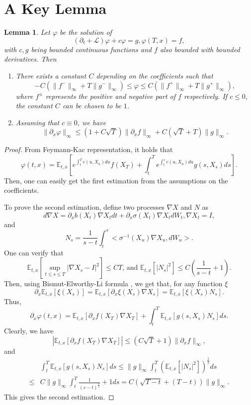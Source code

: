 \documentclass[11pt]{article}
\newtheorem{lemma}{Lemma}[section]
\begin{document}
\section{A Key Lemma}
\begin{lemma}\label{append_lemma}
Let $\varphi$ be the solution of 
$$
(\partial_t+\mathcal L)\varphi+c\varphi=g, \varphi(T,x)=f,
$$
with $c,g$ being bounded continuous functions and $f$ also bounded with bounded derivatives. Then
\begin{enumerate}
    \item There exists a constant $C$ depending on the coefficients such that 
    $$
    -C(\|f^-\|_\infty+T\|g^-\|_\infty)\le \varphi \le C(\|f^+\|_\infty+T\|g^+\|_\infty),
    $$
    where $f^{\pm}$ represents the positive and negative part of $f$ respectively. If $c\le 0$, the constant $C$ can be chosen to be $1$.
    \item Assuming that $c\equiv 0$, we have 
    $$
    \|\partial_x \varphi\|_\infty \le (1+C\sqrt{T})\|\partial_x f\|_\infty+C(\sqrt{T}+T)\|g\|_\infty.
    $$
\end{enumerate}
\end{lemma}
\begin{proof}
From Feymann-Kac representation, it holds that 
$$
\varphi(t,x)=\mathbb E_{t,x}\left[e^{\int_t^T c(u,X_u)du}f(X_T) +\int_t^Te^{\int_t^s c(u,X_u)du}g(s,X_s)ds \right].
$$
Then, one can easily get the first estimation from the assumptions on the coefficients. 

To prove the second estimation, define two processes $\nabla X$ and $N$ as
$$
d\nabla X=\partial_xb(X_t)\nabla X_tdt+\partial_x\sigma(X_t) \nabla X_t dW_t,\nabla X_t=I, 
$$
and 
$$
N_s=\frac{1}{s-t}\int_t^s <\sigma^{-1}(X_u)\nabla X_u ,dW_u>.
$$
One can verify that 
$$
\mathbb E_{t,x}[\sup_{t\le s \le T}|\nabla X_s-I|^2]\le CT\text{, and }\mathbb E_{t,x}[|N_s|^2]\le C(\frac{1}{s-t}+1).
$$
Then, using Bismut-Elworthy-Li formula \cite{elworthy1994formulae}, we get that, for any function $\xi$
$$
\partial_x \mathbb E_{t,x}[\xi(X_s)]=\mathbb E_{t,x}[\partial_x\xi(X_s)\nabla X_s]=\mathbb E_{t,x}[\xi(X_s)N_s].
$$
Thus,
$$
\partial_x \varphi(t,x)=\mathbb E_{t,x}[\partial_x f(X_T)\nabla X_T]+\int_t^T\mathbb E_{t,x}[g(s,X_s)N_s] ds.
$$
Clearly,  we have 
$$
|\mathbb E_{t,x}[\partial_x f(X_T)\nabla X_T]| \le  (C\sqrt{T}+1)\|\partial_x f\|_\infty,
$$
and 
\begin{equation*}
	\begin{split}
		&\int_t^T\mathbb E_{t,x}[g(s,X_s)N_s] ds \le \|g\|_\infty \int_t^T (\mathbb E_{t,x}[|N_s|^2])^{\frac12}ds\\
		 \le& C\|g\|_\infty \int_t^T \frac{1}{(s-t)^\frac12}+1ds=C(\sqrt{T-t}+(T-t))\|g\|_\infty.
	\end{split}
\end{equation*}
This  gives the second estimation. 
\end{proof}
\end{document}
